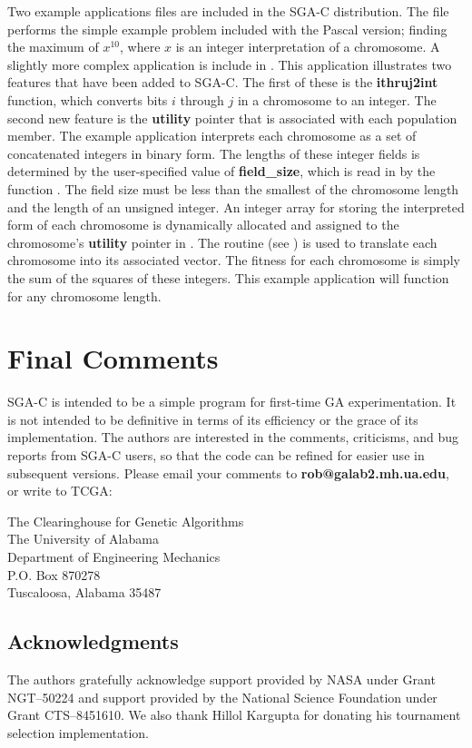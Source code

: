 Two example applications files are included in the SGA-C distribution.  The
file {} performs the simple example problem 
included with the Pascal version; 
finding the maximum of $x^{10}$, where $x$
is an integer interpretation of a chromosome.  
A slightly more complex 
application 
is include in {}.
This application illustrates two features that have been added
to SGA-C. The first of these is the {\bf ithruj2int} function,
which converts bits $i$ through $j$ in a chromosome to an integer.
The second new feature is the {\bf utility} pointer that is associated with each population member.
The example application interprets each chromosome as a set 
of concatenated integers in binary form. The lengths of these integer fields is 
determined by the user-specified value of {\bf field\_size}, which is 
read in by the function
{}.  The field size must be less than the smallest of
the chromosome
length and the length of an unsigned integer.  
An integer array for storing the interpreted form of each chromosome
is dynamically allocated and assigned to the chromosome's {\bf utility} pointer
in {}.
The {} routine (see {}) is used to translate 
each chromosome into its associated vector.
The fitness for each chromosome is simply the sum of the squares of these 
integers. This example application will function for any chromosome length. 

\section{Final Comments}
SGA-C is intended to be a simple
program for first-time GA experimentation. It is 
not intended to be 
definitive in terms of its efficiency 
or the grace of its implementation. The
authors are interested in the comments, criticisms, and bug reports
from SGA-C users, so that the code can be refined for
easier use in subsequent versions.
Please email your comments to {\bf rob@galab2.mh.ua.edu},
or write to TCGA:
\begin{center}
The Clearinghouse for Genetic Algorithms\\
The University of Alabama\\
Department of Engineering Mechanics\\
P.O. Box 870278\\
Tuscaloosa, Alabama 35487
\end{center}

\subsection*{Acknowledgments}
The authors gratefully acknowledge support provided by NASA under
Grant NGT--50224 and support provided by the 
National Science Foundation under Grant CTS--8451610.
We also thank Hillol Kargupta for donating his tournament selection
implementation.




